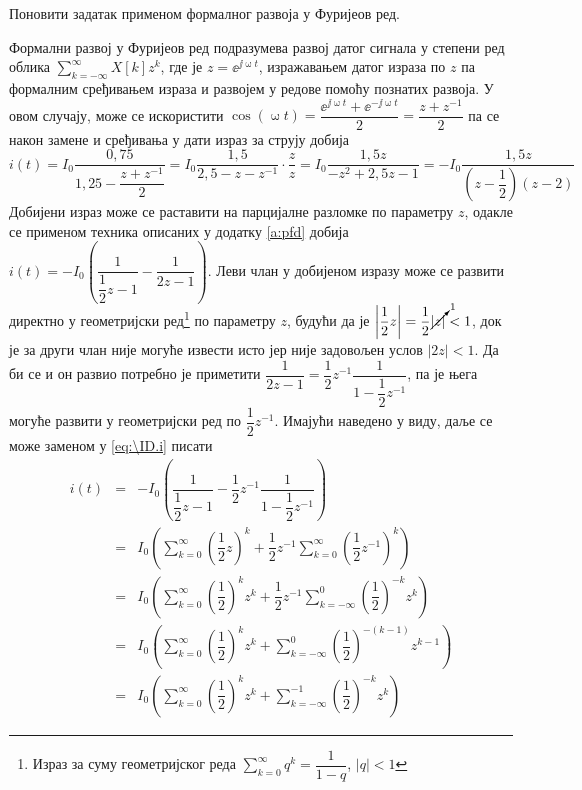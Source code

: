 \PID Поновити задатак  применом формалног развоја у Фуријеов ред. 

\RESENJE

Формални развој у Фуријеов ред подразумева развој датог сигнала у степени ред облика 
$\sum_{k = -\infty}^{\infty} X[k] z^{k}$, где је $z = \ee^{\jj\upomega t}$, изражавањем датог израза по 
$z$ па формалним сређивањем израза и развојем у редове помоћу познатих развоја. У овом случају, може се искористити $\cos(\upomega t) = \dfrac{\ee^{\jj\upomega t} + \ee^{-\jj\upomega t}}{2} 
= \dfrac{z + z^{-1}}{2}$ па се након замене и сређивања у дати израз за струју добија 
\begin{equation}
    i(t) = I_0 \dfrac{0,75}{1,25 - \dfrac{z + z^{-1}}{2} } 
         = I_0 \dfrac{1,5}{2,5 - z - z^{-1}}  
         \cdot 
         \dfrac{z}{z}
         = I_0 \dfrac{1,5 z}{ -z^2 + 2,5 z - 1 } 
         =  -I_0 \dfrac{1,5 z}{ \left( z - \dfrac{1}{2} \right) (z - 2) } \label{eq:\ID.i}
\end{equation}
Добијени израз може се раставити на парцијалне разломке по параметру $z$, одакле се применом техника описаних 
у додатку \ref{a:pfd} добија 
$
    i(t) = -I_0 \left( \dfrac{1}{\dfrac{1}{2}z - 1} - \dfrac{1}{2z - 1} \right). 
$ Леви члан у добијеном изразу може се развити директно у геометријски ред\footnote{Израз за суму геометријског реда 
$\sum_{k = 0}^{\infty} q^k = \dfrac{1}{1 - q}$, $|q| < 1$ } по параметру $z$, будући да је 
$\left\lvert\dfrac{1}{2} z\right\rvert = \dfrac{1}{2} \cancelto{1}{|z|}  < 1$, док је 
за други члан није могуће извести исто јер није задовољен услов $|2z| < 1$. Да би се и он развио потребно је приметити
$
\dfrac{1}{2z - 1} = \dfrac{1}{2}z^{-1} \dfrac{1}{1 - \dfrac{1}{2}z^{-1} }
$, па је њега могуће развити у геометријски ред по $\dfrac{1}{2}z^{-1}$. Имајући наведено у виду, даље се може 
заменом у \eqref{eq:\ID.i} писати
\begin{eqnarray}
    i(t) &=& -I_0 \left(
        \dfrac{1}{\dfrac{1}{2}z - 1} - \dfrac{1}{2}z^{-1} \dfrac{1}{1 - \dfrac{1}{2}z^{-1} }    
    \right) \\[2mm]
    &=& I_0 \left(
      \sum_{k = 0}^{\infty} \left(\dfrac{1}{2}z \right)^k + \dfrac{1}{2} z^{-1} \sum_{k = 0}^{\infty} \left(\dfrac{1}{2} z^{-1} \right)^k     
    \right) \\[2mm]
    &=&
    I_0 \left(
        \sum_{k = 0}^{\infty} \left(\dfrac{1}{2} \right)^k z^k + \dfrac{1}{2} z^{-1} \sum_{k = -\infty}^{0} \left(\dfrac{1}{2}\right)^{-k} z^{k}     
    \right)
    \\[2mm] &=&
    I_0 \left(
        \sum_{k = 0}^{\infty} \left(\dfrac{1}{2} \right)^k z^k + \sum_{k = -\infty}^{0} \left(\dfrac{1}{2}\right)^{-(k-1)} z^{k-1}     
    \right) \\[2mm]
        &=&
    I_0 \left(
        \sum_{k = 0}^{\infty} \left(\dfrac{1}{2} \right)^k z^k + \sum_{k = -\infty}^{-1} \left(\dfrac{1}{2}\right)^{-k} z^k     
    \right)
\end{eqnarray}

